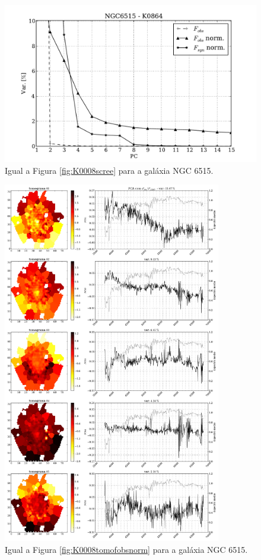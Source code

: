 \begin{figure}
    \includegraphics[height=0.33\textheight]{figuras/K0864-screetest.pdf}
    \caption[Scree test comparativo entre 3 PCAs - NGC 6515.]
	{Igual a Figura \ref{fig:K0008scree} para a galáxia NGC 6515.}
    \label{fig:K0864scree}
\end{figure}

\begin{figure}
    \includegraphics[width=0.85\textwidth]{figuras/K0864-tomo-obs-norm.pdf}
    \caption[Tomogramas de 1 a 5 para o cubo $F_{obs}$ norm. - NGC 6515.]
    {Igual a Figura \ref{fig:K0008tomofobsnorm} para a galáxia NGC 6515.}
    \label{fig:K0864tomofobsnorm}
\end{figure}

